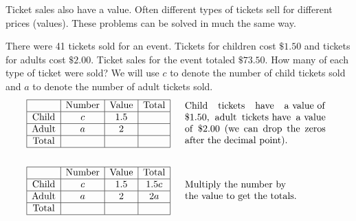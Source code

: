 Ticket sales also have a value. Often different types of tickets sell for
different prices (values). These problems can be solved in much the same way.

\begin{example}
  
  There were 41 tickets sold for an event. Tickets for children cost
  $\$1.50$ and tickets for adults cost $\$2.00$. Ticket sales for the event totaled $\$73.50$. How many of each type of ticket were sold?\pp
	We will use $c$ to denote the number of child tickets sold and $a$ to denote the number of adult tickets sold.
  \begin{eqnarray*}
    \begin{array}{|c|c|c|c|}
      \hline
      & \tmop{Number} & \tmop{Value} & \tmop{Total}\\
      \hline
      \tmop{Child} & c & 1.5 & \\
      \hline
      \tmop{Adult} & a & 2 & \\
      \hline
      \tmop{Total} &  &  & \\
      \hline
    \end{array} &  & \begin{array}{p{0.425\textwidth}}
      \tmop{Child} \tmop{tickets} \tmop{have} \tmop{a~value~of} \$1.50, \tmop{adult}
      \tmop{tickets~have} \tmop{a~value} \tmop{of} \$2.00
      (\tmop{we} \tmop{can} \tmop{drop} \tmop{the} \tmop{zeros} \tmop{after}
      \tmop{the} \tmop{decimal} \tmop{point}).
    \end{array}\\
    &  & \\
    \begin{array}{|c|c|c|c|}
      \hline
      & \tmop{Number} & \tmop{Value} & \tmop{Total}\\
      \hline
      \tmop{Child} & c & 1.5 & 1.5 c\\
      \hline
      \tmop{Adult} & a & 2 & 2 a\\
      \hline
      \tmop{Total} &  &  & \\
      \hline
    \end{array} &  & \begin{array}{p{0.425\textwidth}}
		\text{Multiply~the~number~by} \text{the~value} \text{to~get} \text{the~totals}.
		\end{array}\\
  \end{eqnarray*}
	~\pp

\end{example}
